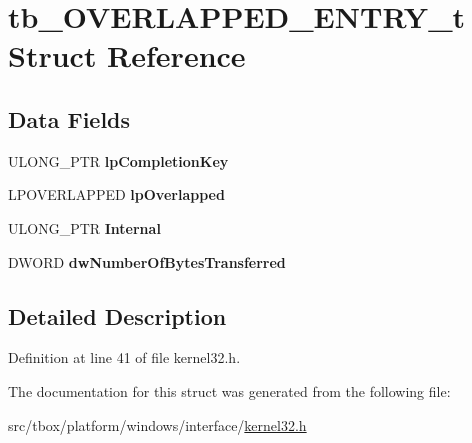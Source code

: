 \hypertarget{structtb__OVERLAPPED__ENTRY__t}{\section{tb\-\_\-\-O\-V\-E\-R\-L\-A\-P\-P\-E\-D\-\_\-\-E\-N\-T\-R\-Y\-\_\-t Struct Reference}
\label{structtb__OVERLAPPED__ENTRY__t}
}
\subsection*{Data Fields}
\begin{DoxyCompactItemize}
\item 
\hypertarget{structtb__OVERLAPPED__ENTRY__t_a5b87c44f4401f8ab21f5c95bc295384c}{U\-L\-O\-N\-G\-\_\-\-P\-T\-R {\bfseries lp\-Completion\-Key}}\label{structtb__OVERLAPPED__ENTRY__t_a5b87c44f4401f8ab21f5c95bc295384c}

\item 
\hypertarget{structtb__OVERLAPPED__ENTRY__t_aa98622ef7f6a7dd155a93d817b69d0b3}{L\-P\-O\-V\-E\-R\-L\-A\-P\-P\-E\-D {\bfseries lp\-Overlapped}}\label{structtb__OVERLAPPED__ENTRY__t_aa98622ef7f6a7dd155a93d817b69d0b3}

\item 
\hypertarget{structtb__OVERLAPPED__ENTRY__t_a5362ebefb4fb2d8f77c7ce7f6b08707e}{U\-L\-O\-N\-G\-\_\-\-P\-T\-R {\bfseries Internal}}\label{structtb__OVERLAPPED__ENTRY__t_a5362ebefb4fb2d8f77c7ce7f6b08707e}

\item 
\hypertarget{structtb__OVERLAPPED__ENTRY__t_ac9f5736dca3c7799ada15227d56db79e}{D\-W\-O\-R\-D {\bfseries dw\-Number\-Of\-Bytes\-Transferred}}\label{structtb__OVERLAPPED__ENTRY__t_ac9f5736dca3c7799ada15227d56db79e}

\end{DoxyCompactItemize}


\subsection{Detailed Description}


Definition at line 41 of file kernel32.\-h.



The documentation for this struct was generated from the following file\-:\begin{DoxyCompactItemize}
\item 
src/tbox/platform/windows/interface/\hyperlink{kernel32_8h}{kernel32.\-h}\end{DoxyCompactItemize}

